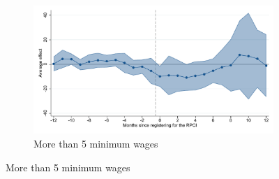 \begin{figure}[H]
    \begin{subfigure}{0.32\textwidth}
    \caption{More than 5 minimum wages}
    \includegraphics[width=\textwidth]{04_Figures/muestra_10porciento/event_study_sal_formal_sal_min_5_dcdh_connected.pdf}
    \end{subfigure}
    
\end{figure}

\clearpage

